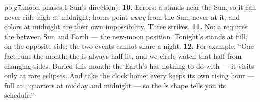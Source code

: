\begin{solution}{pb:g7:moon-phases:1}
Sun's direction).
\textbf{10.} Errors: a  stands near the Sun, so it can
never ride high at midnight; horns point \emph{away} from the
Sun, never at it; and  colors at midnight are their own
impossibility. Three strikes.
\textbf{11.} No: a  requires the  between Sun
and Earth --- the new-moon position. Tonight's  stands at
full, on the opposite side: the two events cannot share a
night.
\textbf{12.} For example: ``One fact runs the month: the 
is always half lit, and we circle-watch that half from
changing sides. Buried this month: the Earth's  has
nothing to do with  --- it visits only at rare eclipses.
And take the clock home: every  keeps its own rising hour
--- full at , quarters at midday and midnight --- so the
's shape tells you its schedule.''
\end{solution}
